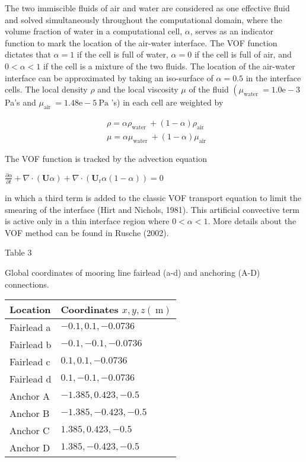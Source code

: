 The two immiscible fluids of air and water are considered as one effective fluid and solved simultaneously throughout the computational domain, where the volume fraction of water in a computational cell, $\alpha$, serves as an indicator function to mark the location of the air-water interface. The VOF function dictates that $\alpha=1$ if the cell is full of water, $\alpha=0$ if the cell is full of air, and $0<\alpha<1$ if the cell is a mixture of the two fluids. The location of the air-water interface can be approximated by taking an iso-surface of $\alpha=0.5$ in the interface cells. The local density $\rho$ and the local viscosity $\mu$ of the fluid $\left(\mu_{\text {water }}=1.0 \mathrm{e}-3\right.$ Pa's and $\mu_{\text {air }}=1.48 \mathrm{e}-5 \mathrm{~Pa}$ 's) in each cell are weighted by

$$
\begin{aligned}
& \rho=\alpha \rho_{\text {water }}+(1-\alpha) \rho_{\text {air }} \\
& \mu=\alpha \mu_{\text {water }}+(1-\alpha) \mu_{\text {air }}
\end{aligned}
$$

The VOF function is tracked by the advection equation

$\frac{\partial \alpha}{\partial t}+\nabla \cdot(\mathbf{U} \alpha)+\nabla \cdot\left(\mathbf{U}_{\mathrm{r}} \alpha(1-\alpha)\right)=0$

in which a third term is added to the classic VOF transport equation to limit the smearing of the interface (Hirt and Nichols, 1981). This artificial convective term is active only in a thin interface region where $0<\alpha<1$. More details about the VOF method can be found in Rusche (2002).

Table 3

Global coordinates of mooring line fairlead (a-d) and anchoring (A-D) connections.

\begin{tabular}{ll}
\hline Location & Coordinates $x, y, z(\mathrm{~m})$ \\
\hline Fairlead a & $-0.1,0.1,-0.0736$ \\
Fairlead b & $-0.1,-0.1,-0.0736$ \\
Fairlead c & $0.1,0.1,-0.0736$ \\
Fairlead d & $0.1,-0.1,-0.0736$ \\
Anchor A & $-1.385,0.423,-0.5$ \\
Anchor B & $-1.385,-0.423,-0.5$ \\
Anchor C & $1.385,0.423,-0.5$ \\
Anchor D & $1.385,-0.423,-0.5$ \\
\hline
\end{tabular}

